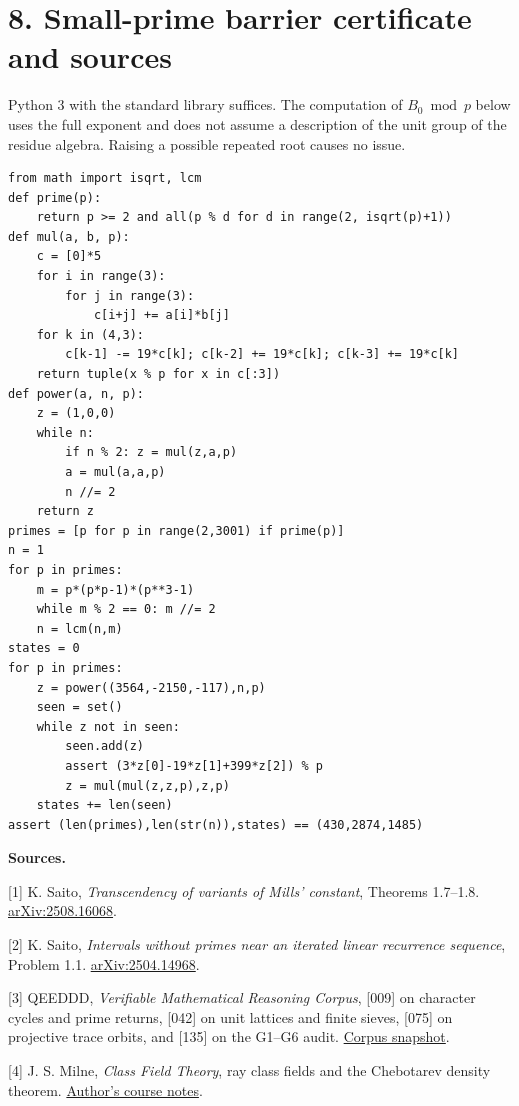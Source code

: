 \documentclass[11pt,a4paper,oneside,openany]{book}
\newcommand{\lead}[1]{\textbf{#1}\enspace}\let\para\lead
\newcommand{\localhead}[1]{\needspace{5\baselineskip}\section*{\color{ink}#1}}
\let\sect\localhead\let\secx\localhead\let\head\localhead
\begin{document}
\sect{8. Small-prime barrier certificate and sources}
Python 3 with the standard library suffices. The computation of $B_0\bmod p$ below uses the full exponent and does not assume a description of the unit group of the residue algebra. Raising a possible repeated root causes no issue.
{\footnotesize
\begin{Verbatim}[fontsize=\footnotesize,breaklines,breakanywhere]
from math import isqrt, lcm
def prime(p):
    return p >= 2 and all(p % d for d in range(2, isqrt(p)+1))
def mul(a, b, p):
    c = [0]*5
    for i in range(3):
        for j in range(3):
            c[i+j] += a[i]*b[j]
    for k in (4,3):
        c[k-1] -= 19*c[k]; c[k-2] += 19*c[k]; c[k-3] += 19*c[k]
    return tuple(x % p for x in c[:3])
def power(a, n, p):
    z = (1,0,0)
    while n:
        if n % 2: z = mul(z,a,p)
        a = mul(a,a,p)
        n //= 2
    return z
primes = [p for p in range(2,3001) if prime(p)]
n = 1
for p in primes:
    m = p*(p*p-1)*(p**3-1)
    while m % 2 == 0: m //= 2
    n = lcm(n,m)
states = 0
for p in primes:
    z = power((3564,-2150,-117),n,p)
    seen = set()
    while z not in seen:
        seen.add(z)
        assert (3*z[0]-19*z[1]+399*z[2]) % p
        z = mul(mul(z,z,p),z,p)
    states += len(seen)
assert (len(primes),len(str(n)),states) == (430,2874,1485)
\end{Verbatim}
}
\lead{Sources.}
{\small
[1] K. Saito, \emph{Transcendency of variants of Mills' constant}, Theorems 1.7--1.8. \href{https://arxiv.org/abs/2508.16068}{arXiv:2508.16068}.

[2] K. Saito, \emph{Intervals without primes near an iterated linear recurrence sequence}, Problem 1.1. \href{https://arxiv.org/abs/2504.14968}{arXiv:2504.14968}.

[3] QEEDDD, \emph{Verifiable Mathematical Reasoning Corpus}, [009] on character cycles and prime returns, [042] on unit lattices and finite sieves, [075] on projective trace orbits, and [135] on the G1--G6 audit. \href{https://github.com/QEEDDD/Verifiable-Mathematical-Reasoning-Corpus/tree/38348353416f1f7fc50cecb93c3b554a00260c13}{Corpus snapshot}.

[4] J. S. Milne, \emph{Class Field Theory}, ray class fields and the Chebotarev density theorem. \href{https://www.jmilne.org/math/CourseNotes/CFT.pdf}{Author's course notes}.}


\end{document}
